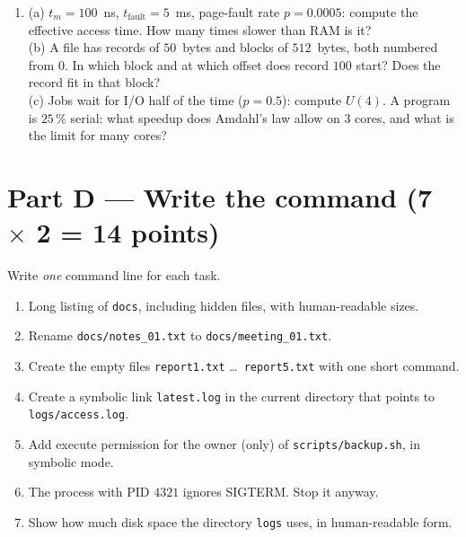 \begin{enumerate}[leftmargin=1.8em,label=C\arabic*.]
\begin{center}
  \end{center}
  \item (a) $t_m = 100$~ns, $t_{\text{fault}} = 5$~ms, page-fault rate $p = 0.0005$: compute the effective access time. How many times slower than RAM is it? \\
  (b) A file has records of $50$~bytes and blocks of $512$~bytes, both numbered from $0$. In which block and at which offset does record $100$ start? Does the record fit in that block? \\
  (c) Jobs wait for I/O half of the time ($p = 0.5$): compute $U(4)$. A program is $25\,\%$ serial: what speedup does Amdahl's law allow on $3$ cores, and what is the limit for many cores? 
  \ans{6.0cm}
\end{enumerate}

\newpage
\section*{Part D --- Write the command \hfill (7 $\times$ 2 = 14 points)}
Write \emph{one} command line for each task.
\begin{enumerate}[leftmargin=1.8em,label=D\arabic*.]
  \item Long listing of \texttt{docs}, including hidden files, with human-readable sizes. \ans{0.9cm}
  \item Rename \texttt{docs/notes\_01.txt} to \texttt{docs/meeting\_01.txt}. \ans{0.9cm}
  \item Create the empty files \texttt{report1.txt} \dots\ \texttt{report5.txt} with one short command. \ans{0.9cm}
  \item Create a symbolic link \texttt{latest.log} in the current directory that points to \texttt{logs/access.log}. \ans{0.9cm}
  \item Add execute permission for the owner (only) of \texttt{scripts/backup.sh}, in symbolic mode. \ans{0.9cm}
  \item The process with PID $4321$ ignores SIGTERM. Stop it anyway. \ans{0.9cm}
  \item Show how much disk space the directory \texttt{logs} uses, in human-readable form. \ans{0.9cm}
\end{enumerate}

